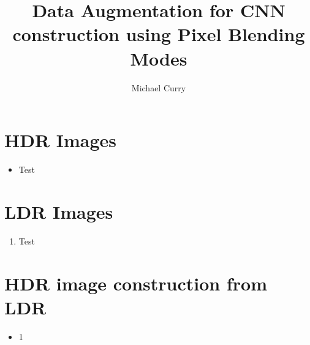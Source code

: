 \documentclass{beamer}
\author{Michael Curry}
\title{Data Augmentation for CNN construction using Pixel Blending Modes}
\institute{SUNY New Paltz}
\begin{document}
	\begin{frame}
    \titlepage
    \end{frame}

	
	\begin{frame}
		\tableofcontents[sectionstyle=show,subsectionstyle=show/shaded/hide,subsubsectionstyle=show/shaded/hide]
	\end{frame}
		
	
	\section{HDR Images}
		    \begin{frame}
			    \begin{itemize} 
			    \item Test
			    \end{itemize}
		    \end{frame}
	
	\section{LDR Images}
		    \begin{frame}
			    \begin{enumerate}
			    \item Test
			    \end{enumerate}	
		    \end{frame}
	
	\section{HDR image construction from LDR}
	
	\begin{frame}
		\begin{itemize}
		\item 1
		\end{itemize}
	\end{frame}
		
\end{document}
